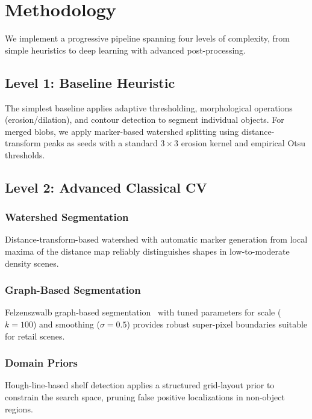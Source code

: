 \documentclass[conference]{IEEEtran}
\begin{document}
\section{Methodology}
\label{sec:methodology}

We implement a progressive pipeline spanning four levels of complexity, from
simple heuristics to deep learning with advanced post-processing.

\subsection{Level 1: Baseline Heuristic}
\label{sec:heuristic}

The simplest baseline applies adaptive thresholding, morphological
operations (erosion/dilation), and contour detection to segment individual
objects. For merged blobs, we apply marker-based watershed splitting using
distance-transform peaks as seeds with a standard $3 \times 3$ erosion
kernel and empirical Otsu thresholds.

\subsection{Level 2: Advanced Classical CV}
\label{sec:classical_cv}

\subsubsection{Watershed Segmentation}
Distance-transform-based watershed with automatic marker generation from
local maxima of the distance map reliably distinguishes shapes in
low-to-moderate density scenes.

\subsubsection{Graph-Based Segmentation}
Felzenszwalb graph-based segmentation~\cite{felzenszwalb2004efficient}
with tuned parameters for scale ($k=100$) and smoothing ($\sigma=0.5$)
provides robust super-pixel boundaries suitable for retail scenes.

\subsubsection{Domain Priors}
Hough-line-based shelf detection applies a structured grid-layout prior
to constrain the search space, pruning false positive localizations
in non-object regions.
\end{document}
